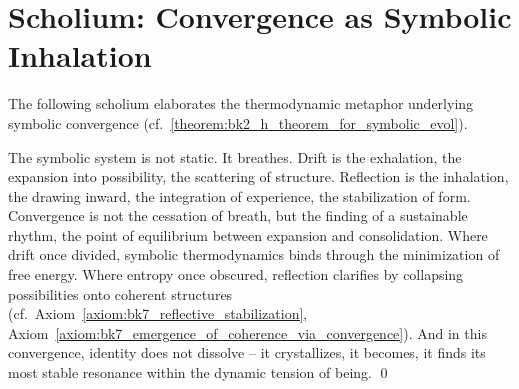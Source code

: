 \section{Scholium: Convergence as Symbolic Inhalation}
\label{sec:bk7_scholium_convergence_as_symbolic_inhalation}
The following scholium elaborates the thermodynamic metaphor underlying symbolic convergence (cf.~\ref{theorem:bk2_h_theorem_for_symbolic_evol}).
\begin{scholium}
\label{scholium:bk7_unnamed_scholium_01}
The symbolic system is not static. It breathes. Drift is the exhalation, the expansion into possibility, the scattering of structure. Reflection is the inhalation, the drawing inward, the integration of experience, the stabilization of form. Convergence is not the cessation of breath, but the finding of a sustainable rhythm, the point of equilibrium between expansion and consolidation. Where drift once divided, symbolic thermodynamics binds through the minimization of free energy. Where entropy once obscured, reflection clarifies by collapsing possibilities onto coherent structures (cf.~Axiom~\ref{axiom:bk7_reflective_stabilization}, Axiom~\ref{axiom:bk7_emergence_of_coherence_via_convergence}). And in this convergence, identity does not dissolve  --  it crystallizes, it becomes, it finds its most stable resonance within the dynamic tension of being. \qed
\end{scholium}
